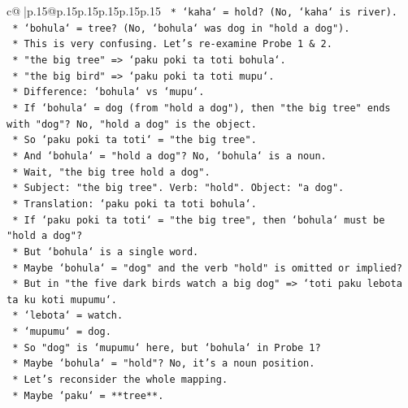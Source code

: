 \documentclass{article}
\begin{document}
{\begin{supertabular}{c@{$\;$}|p{.15\linewidth}@{}p{.15\linewidth}p{.15\linewidth}p{.15\linewidth}p{.15\linewidth}p{.15\linewidth}}
{{{\texttt{                *   `kaha` = hold? (No, `kaha` is river).} \\
\texttt{                *   `bohula` = tree? (No, `bohula` was dog in "hold a dog").} \\
\texttt{            *   This is very confusing. Let's re{-}examine Probe 1 \& 2.} \\
\texttt{                *   "the big tree" => `paku poki ta toti bohula`.} \\
\texttt{                *   "the big bird" => `paku poki ta toti mupu`.} \\
\texttt{                *   Difference: `bohula` vs `mupu`.} \\
\texttt{                *   If `bohula` = dog (from "hold a dog"), then "the big tree" ends with "dog"? No, "hold a dog" is the object.} \\
\texttt{                *   So `paku poki ta toti` = "the big tree".} \\
\texttt{                *   And `bohula` = "hold a dog"? No, `bohula` is a noun.} \\
\texttt{                *   Wait, "the big tree hold a dog".} \\
\texttt{                *   Subject: "the big tree". Verb: "hold". Object: "a dog".} \\
\texttt{                *   Translation: `paku poki ta toti bohula`.} \\
\texttt{                *   If `paku poki ta toti` = "the big tree", then `bohula` must be "hold a dog"?} \\
\texttt{                *   But `bohula` is a single word.} \\
\texttt{                *   Maybe `bohula` = "dog" and the verb "hold" is omitted or implied?} \\
\texttt{                *   But in "the five dark birds watch a big dog" => `toti paku lebota ta ku koti mupumu`.} \\
\texttt{                    *   `lebota` = watch.} \\
\texttt{                    *   `mupumu` = dog.} \\
\texttt{                *   So "dog" is `mupumu` here, but `bohula` in Probe 1?} \\
\texttt{                *   Maybe `bohula` = "hold"? No, it's a noun position.} \\
\texttt{                *   Let's reconsider the whole mapping.} \\
\texttt{                *   Maybe `paku` = **tree**.} \\
}}}
\end{supertabular}}
\end{document}
